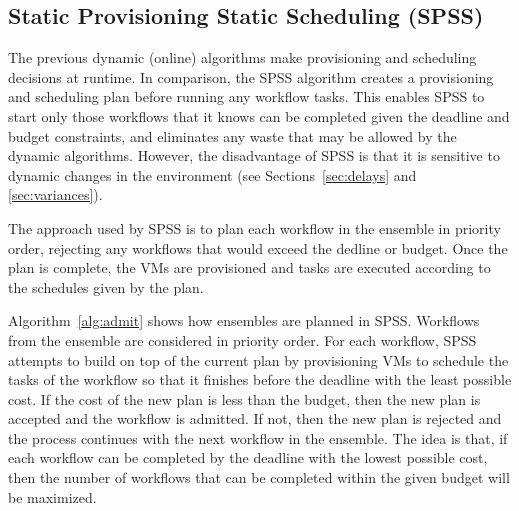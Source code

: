 \documentclass[conference]{IEEEtran}
\begin{document}
\subsection{Static Provisioning Static Scheduling (SPSS)}

The previous dynamic (online) algorithms make provisioning and scheduling
decisions at runtime. In comparison, the SPSS algorithm creates a provisioning
and scheduling plan before running any workflow tasks. This enables SPSS to
start only those workflows that it knows can be completed given the deadline and
budget constraints, and eliminates any waste that may be allowed by the dynamic
algorithms. However, the disadvantage of SPSS is that it is sensitive to dynamic
changes in the environment (see Sections~\ref{sec:delays} and
\ref{sec:variances}).


The approach used by SPSS is to plan each workflow in the ensemble in priority
order, rejecting any workflows that would exceed the dedline or budget. Once the
plan is complete, the VMs are provisioned and tasks are executed according to
the schedules given by the plan.




Algorithm~\ref{alg:admit} shows how ensembles are planned in SPSS. Workflows
from the ensemble are considered in priority order. For each workflow, SPSS
attempts to build on top of the current plan by provisioning VMs to schedule the
tasks of the workflow so that it finishes before the deadline with the least
possible cost. If the cost of the new plan is less than the budget, then the new
plan is accepted and the workflow is admitted. If not, then the new plan is
rejected and the process continues with the next workflow in the ensemble. The
idea is that, if each workflow can be completed by the
deadline with the lowest possible cost, then the number of workflows that can be
completed within the given budget will be maximized.
\end{document}
